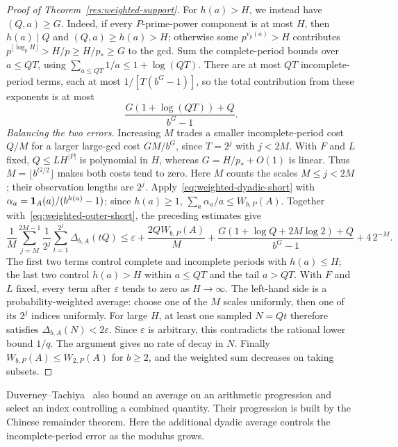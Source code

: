 \documentclass[11pt]{article}
\begin{document}
\begin{proof}[Proof of Theorem~\ref{res:weighted-support}]
For $h(a)>H$, we instead have $(Q,a)\ge G$. Indeed, if every
$P$-prime-power component is at most $H$, then $h(a)\mid Q$ and
$(Q,a)\ge h(a)>H$; otherwise some $p^{v_p(a)}>H$ contributes
$p^{\lfloor\log_pH\rfloor}>H/p\ge H/p_*\ge G$ to the gcd.
Sum the complete-period bounds over $a\le QT$, using
$\sum_{a\le QT}1/a\le1+\log(QT)$. There are at most $QT$
incomplete-period terms, each at most $1/[T(b^G-1)]$, so the total
contribution from these exponents is at most
\[
 \frac{G(1+\log(QT))+Q}{b^G-1}.
\]
\emph{Balancing the two errors.}
Increasing $M$ trades a smaller incomplete-period cost $Q/M$ for a
larger large-gcd cost $GM/b^G$, since $T=2^j$ with $j<2M$.
With $F$ and $L$ fixed, $Q\le LH^{|P|}$ is polynomial in $H$, whereas
$G=H/p_*+O(1)$ is linear. Thus $M=\lfloor b^{G/2}\rfloor$ makes
both costs tend to zero. Here $M$ counts the scales $M\le j<2M$;
their observation lengths are $2^j$.
Apply~\eqref{eq:weighted-dyadic-short} with
$\alpha_a={\bf1}_A(a)/(b^{h(a)}-1)$; since $h(a)\ge1$,
$\sum_a\alpha_a/a\le W_{b,P}(A)$.
Together with~\eqref{eq:weighted-outer-short}, the preceding estimates give
\begin{equation}\label{eq:weighted-main-bound}
 \frac1M\sum_{j=M}^{2M-1}\frac1{2^j}
 \sum_{t=1}^{2^j}\Delta_{b,A}(tQ)
 \le \varepsilon+\frac{2QW_{b,P}(A)}M
 +\frac{G(1+\log Q+2M\log2)+Q}{b^G-1}+4\,2^{-M}.
\end{equation}
The first two terms control complete and incomplete periods with
$h(a)\le H$; the last two control $h(a)>H$ within $a\le QT$ and the
tail $a>QT$. With $F$ and $L$ fixed, every term after
$\varepsilon$ tends to zero as $H\to\infty$. The left-hand side is a probability-weighted average: choose one of
the $M$ scales uniformly, then one of its $2^j$ indices uniformly.
For large $H$, at least one sampled $N=Qt$ therefore satisfies
$\Delta_{b,A}(N)<2\varepsilon$. Since $\varepsilon$ is arbitrary,
this contradicts the rational lower bound $1/q$. The argument gives
no rate of decay in $N$.  Finally
$W_{b,P}(A)\le W_{2,P}(A)$ for $b\ge2$, and the weighted sum decreases on taking
subsets.
\end{proof}

Duverney--Tachiya~\cite[Section~2, (2.3)--(2.9)]{duverneytachiya}
also bound an average on an arithmetic progression and select an index
controlling a combined quantity. Their progression is built by the
Chinese remainder theorem. Here the additional dyadic average controls
the incomplete-period error as the modulus grows.
\end{document}
